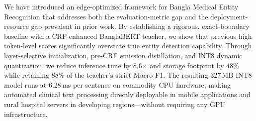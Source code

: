 \documentclass[conference]{IEEEtran}
\begin{document}
We have introduced an edge-optimized framework for Bangla Medical Entity Recognition that addresses both the evaluation-metric gap and the deployment-resource gap prevalent in prior work. By establishing a rigorous, exact-boundary baseline with a CRF-enhanced BanglaBERT teacher, we show that previous high token-level scores significantly overstate true entity detection capability. Through layer-selective initialization, pre-CRF emission distillation, and INT8 dynamic quantization, we reduce inference time by 8.6$\times$ and storage footprint by 48\% while retaining 88\% of the teacher's strict Macro F1. The resulting 327\,MB INT8 model runs at 6.28\,ms per sentence on commodity CPU hardware, making automated clinical text processing directly deployable in mobile applications and rural hospital servers in developing regions---without requiring any GPU infrastructure.
\end{document}
